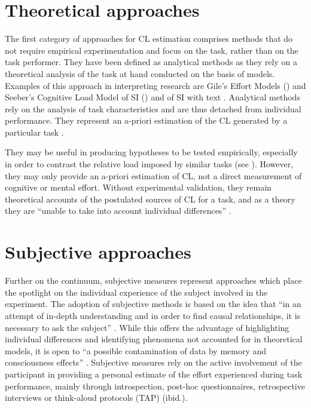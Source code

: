 \section{Theoretical approaches} \label{theoreticalm}
The first category of approaches for CL estimation comprises methods that do not require empirical experimentation and focus on the task, rather than on the task performer. They have been defined as analytical methods \citep[66]{paas_cognitive_2003} as they rely on a theoretical analysis of the task at hand conducted on the basis of models. Examples of this approach in interpreting research are Gile's Effort Models (\citeyear{gile_regards_1995, gile_basic_2009}) and Seeber's Cognitive Load Model of SI (\citeyear{seeber_thinking_2007, seeber_cognitive_2011}) and of SI with text \citep{seeber_multimodal_2017}. Analytical methods rely on the analysis of task characteristics and are thus detached from individual performance. They represent an a-priori estimation of the CL generated by a particular task \citep[647]{chen_construct_2017}.

They may be useful in producing hypotheses to be tested empirically, especially in order to contrast the relative load imposed by similar tasks  (see \citealt{seeber_cognitive_2011,seeber_cognitive_2012}). However, they may only provide an a-priori estimation of CL, not a direct measurement of cognitive or mental effort. Without experimental validation, they remain theoretical accounts of the postulated sources of CL for a task, and as a theory they are ``unable to take into account individual differences'' \citep[22]{seeber_cognitive_2013}.


\section{Subjective approaches}\label{subjective_approaches}
\largerpage
\begin{sloppypar}
Further on the continuum, subjective measures represent approaches which place the spotlight on the individual experience of the subject involved in the experiment. The adoption of subjective methods is based on the idea that ``in an attempt of in-depth understanding and in order to find causal relationships, it is necessary to ask the subject'' \citep[3]{carl_digital_2011}. While this offers the advantage of highlighting individual differences and identifying phenomena not accounted for in theoretical models, it is open to ``a possible contamination of data by memory and consciousness effects'' \citep[19]{seeber_cognitive_2013}. Subjective measures rely on the active involvement of the participant in providing a personal estimate of the effort experienced during task performance, mainly through introspection, post-hoc questionnaires, retrospective interviews or think-aloud protocols (TAP) (ibid.).
\end{sloppypar}





